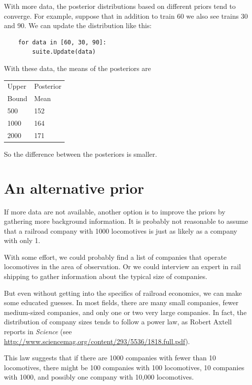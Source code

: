 \documentclass[12pt]{book}
\begin{document}
With more data, the posterior distributions based on different
priors tend to converge.  For example, suppose that in addition
to train 60 we also see trains 30 and 90.  We can update the
distribution like this:

\begin{verbatim}
    for data in [60, 30, 90]:
        suite.Update(data)
\end{verbatim}

With these data, the means of the posteriors are

  \begin{tabular}{|l|l|}
  \hline
  Upper & Posterior \\
  Bound & Mean \\
  \hline
  500 & 152 \\
  1000 & 164\\
  2000 & 171\\
  \hline
  \end{tabular}

So the difference between the posteriors is smaller.


\section{An alternative prior}

If more data are not available, another option is to improve the
priors by gathering more background information.  It is probably
not reasonable to assume that a railroad company with 1000 locomotives
is just as likely as a company with only 1.

With some effort, we could probably find a list of companies that
operate locomotives in the area of observation.  Or we could
interview an expert in rail shipping to gather information about
the typical size of companies.

But even without getting into the specifics of railroad economics, we
can make some educated guesses.  In most fields, there are many small
companies, fewer medium-sized companies, and only one or two very
large companies.  In fact, the distribution of company sizes tends to
follow a power law, as Robert Axtell reports in {\it Science} (see
\url{http://www.sciencemag.org/content/293/5536/1818.full.pdf}).

This law suggests that if there are 1000 companies with fewer than
10 locomotives, there might be 100 companies with 100 locomotives,
10 companies with 1000, and possibly one company with 10,000 locomotives.
\end{document}
